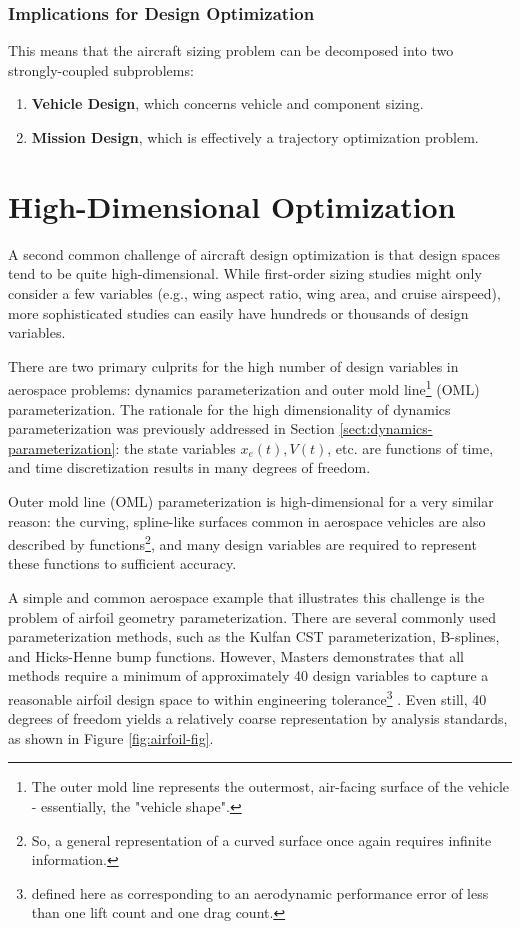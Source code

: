 \subsubsection{Implications for Design Optimization}

This means that the aircraft sizing problem can be decomposed into two strongly-coupled subproblems:

\begin{enumerate}
    \item \textbf{Vehicle Design}, which concerns vehicle and component sizing.
    \item \textbf{Mission Design}, which is effectively a trajectory optimization problem.
\end{enumerate}



\section{High-Dimensional Optimization}
\label{sect:high-dim-opt}

A second common challenge of aircraft design optimization is that design spaces tend to be quite high-dimensional. While first-order sizing studies might only consider a few variables (e.g., wing aspect ratio, wing area, and cruise airspeed), more sophisticated studies can easily have hundreds or thousands of design variables.

There are two primary culprits for the high number of design variables in aerospace problems: dynamics parameterization and outer mold line\footnote{The outer mold line represents the outermost, air-facing surface of the vehicle - essentially, the "vehicle shape".} (OML) parameterization. The rationale for the high dimensionality of dynamics parameterization was previously addressed in Section \ref{sect:dynamics-parameterization}: the state variables $x_e(t), V(t)$, etc. are functions of time, and time discretization results in many degrees of freedom.

Outer mold line (OML) parameterization is high-dimensional for a very similar reason: the curving, spline-like surfaces common in aerospace vehicles are also described by functions\footnote{So, a general representation of a curved surface once again requires infinite information.}, and many design variables are required to represent these functions to sufficient accuracy.

A simple and common aerospace example that illustrates this challenge is the problem of airfoil geometry parameterization. There are several commonly used parameterization methods, such as the Kulfan CST parameterization, B-splines, and Hicks-Henne bump functions. However, Masters demonstrates that all methods require a minimum of approximately 40 design variables to capture a reasonable airfoil design space to within engineering tolerance\footnote{defined here as corresponding to an aerodynamic performance error of less than one lift count and one drag count.} \cite{masters2017}. Even still, 40 degrees of freedom yields a relatively coarse representation by analysis standards, as shown in Figure \ref{fig:airfoil-fig}.

